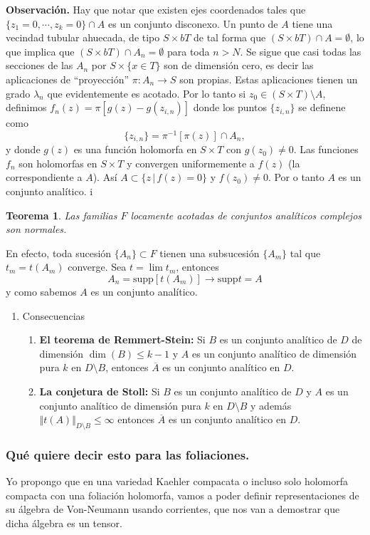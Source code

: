 \documentclass[letterpaper]{article}
\newtheorem{teorema}{Teorema}[section]
\newcommand{\obs}{{\noindent \sc \textbf{Observación. }}}
\begin{document}
\obs Hay que notar que existen ejes coordenados tales que \(\{z_1=0,\cdots,z_k=0\}\cap A\) es un conjunto disconexo. Un punto de \(A\) tiene una vecindad tubular ahuecada, de tipo \(S\times bT\) de tal forma que \((S\times bT)\cap A=\emptyset\), lo que implica que \((S\times bT)\cap A_n=\emptyset\) para toda \(n>N\). Se sigue que casi todas las secciones de las \(A_n\) por \(S\times\{x\in T\}\) son de dimensión cero, es decir las aplicaciones de ``proyección'' \(\pi:A_n\rightarrow S\) son propias. Estas aplicaciones tienen un grado \(\lambda_n\) que evidentemente es acotado. Por lo tanto si \(z_0\in(S\times T)\setminus A\), definimos \(f_n(z)=\pi[g(z)-g(z_{i,n})]\) donde los puntos \(\{z_{i,n}\}\) se definene como
\[
\{z_{i,n}\}=\pi^{-1}[\pi(z)]\cap A_n,
\]
y donde \(g(z)\) es una función holomorfa en \(S\times T\) con \(g(z_0)\neq0\). Las funciones \(f_n\) son holomorfas en \(S\times T\) y convergen uniformemente a \(f(z)\) (la correspondiente a \(A\)). Así \(A\subset\{z\,|\,f(z)=0\}\) y \(f(z_0)\neq0\). Por o tanto \(A\) es un conjunto analítico.
i\begin{teorema}
Las familias \(F\) locamente acotadas de conjuntos analíticos complejos son normales.
\end{teorema}
En efecto, toda sucesión \(\{A_n\}\subset F\) tienen una subsucesión \(\{A_m\}\) tal que \(t_m=t(A_m)\) converge. Sea \(t=\lim t_m\), entonces
\[
    A_n=\mathrm{supp}[t(A_m)]\rightarrow\mathrm{supp}t=A
\]
y como sabemos \(A\) es un conjunto analítico.
\begin{enumerate}
\item Consecuencias
\label{sec:org02bb745}
\begin{enumerate}
\item \textbf{El teorema de Remmert-Stein:} Si \(B\) es un conjunto analítico de \(D\) de dimensión \(\dim(B)\leq k-1\) y \(A\) es un conjunto analítico de dimensión pura \(k\) en \(D\setminus B\), entonces \(\overline{A}\) es un conjunto analítico en \(D\).
\item \textbf{La conjetura de Stoll:} Si \(B\) es un conjunto analítico de \(D\) y \(A\) es un conjunto analítico de dimensión pura \(k\) en \(D\setminus B\) y además \(\Vert t(A)\Vert_{D\setminus B}\leq\infty\) entonces \(\overline{A}\) es un conjunto analítico en \(D\).
\end{enumerate}
\end{enumerate}
\subsubsection{Qué quiere decir esto para las foliaciones.}
\label{sec:orgcfd4ce9}
\noindent Yo propongo que en una variedad Kaehler compacata o incluso solo holomorfa compacta con una foliación holomorfa, vamos a poder definir representaciones de su álgebra de Von-Neumann usando corrientes, que nos van a demostrar que dicha álgebra es un tensor.
\end{document}
